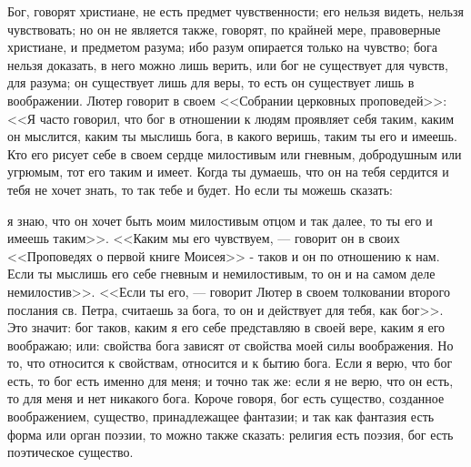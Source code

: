 \documentclass[12pt]{article}
\begin{document}
Бог, говорят христиане, не есть предмет чувственности; его нельзя видеть, нельзя чувствовать; но он не является также, говорят, по крайней мере, правоверные христиане, и предметом разума; ибо разум опирается только на чувство; бога нельзя доказать, в него можно лишь верить, или бог не существует для чувств, для разума; он существует лишь для веры, то есть он существует лишь в воображении. Лютер говорит в своем <<Собрании церковных проповедей>>: <<Я часто говорил, что бог в отношении к людям проявляет себя таким, каким он мыслится, каким ты мыслишь бога, в какого веришь, таким ты его и имеешь. Кто его рисует себе в своем сердце милостивым или гневным, добродушным или угрюмым, тот его таким и имеет. Когда ты думаешь, что он на тебя сердится и тебя не хочет знать, то так тебе и будет. Но если ты можешь сказать: 

я знаю, что он хочет быть моим милостивым отцом и так далее, то ты его и имеешь таким>>. <<Каким мы его чувствуем, --- говорит он в своих <<Проповедях о первой книге Моисея>> - таков и он по отношению к нам. Если ты мыслишь его себе гневным и немилостивым, то он и на самом деле немилостив>>. <<Если ты его, --- говорит Лютер в своем толковании второго послания св. Петра, считаешь за бога, то он и действует для тебя, как бог>>. Это значит: бог таков, каким я его себе представляю в своей вере, каким я его воображаю; или: свойства бога зависят от свойства моей силы воображения. Но то, что относится к свойствам, относится и к бытию бога. Если я верю, что бог есть, то бог есть именно для меня; и точно так же: если я не верю, что он есть, то для меня и нет никакого бога. Короче говоря, бог есть существо, созданное воображением, существо, принадлежащее фантазии; и так как фантазия есть форма или орган поэзии, то можно также сказать: религия есть поэзия, бог есть поэтическое существо. 
\end{document}
